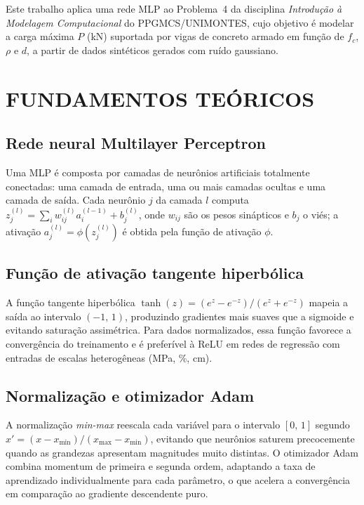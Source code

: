 \documentclass[12pt,fleqn]{article}
\begin{document}
Este trabalho aplica uma rede MLP ao Problema~4 da disciplina \textit{Introdução
à Modelagem Computacional} do PPGMCS/UNIMONTES, cujo objetivo é modelar a carga
máxima $P$ (kN) suportada por vigas de concreto armado em função de $f_c$,
$\rho$ e $d$, a partir de dados sintéticos gerados com ruído gaussiano.


\section{FUNDAMENTOS TEÓRICOS}

\subsection{Rede neural Multilayer Perceptron}

Uma MLP é composta por camadas de neurônios artificiais totalmente conectadas: uma
camada de entrada, uma ou mais camadas ocultas e uma camada de saída. Cada neurônio
$j$ da camada $l$ computa $z_j^{(l)} = \sum_i w_{ij}^{(l)} a_i^{(l-1)} + b_j^{(l)}$,
onde $w_{ij}$ são os pesos sinápticos e $b_j$ o viés; a ativação $a_j^{(l)} =
\phi(z_j^{(l)})$ é obtida pela função de ativação $\phi$.

\subsection{Função de ativação tangente hiperbólica}

A função tangente hiperbólica $\tanh(z) = (e^z - e^{-z})/(e^z + e^{-z})$ mapeia
a saída ao intervalo $(-1,\,1)$, produzindo gradientes mais suaves que a sigmoide
e evitando saturação assimétrica. Para dados normalizados, essa função favorece
a convergência do treinamento e é preferível à ReLU em redes de regressão com
entradas de escalas heterogêneas (MPa, \%, cm).

\subsection{Normalização e otimizador Adam}

A normalização \textit{min-max} reescala cada variável para o intervalo $[0,\,1]$
segundo $x' = (x - x_{\min})/(x_{\max} - x_{\min})$, evitando que neurônios
saturem precocemente quando as grandezas apresentam magnitudes muito distintas.
O otimizador Adam combina momentum de primeira e segunda ordem, adaptando a taxa
de aprendizado individualmente para cada parâmetro, o que acelera a convergência
em comparação ao gradiente descendente puro.
\end{document}
